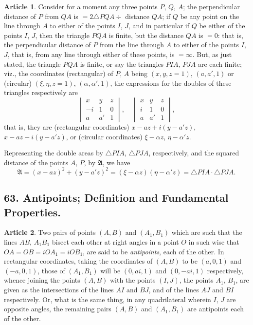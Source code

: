 \documentclass[11pt,a4paper]{article}
\theoremstyle{definition}
\newtheorem{art}{Article}
\begin{document}
\begin{art}
Consider for a moment any three points $P$, $Q$, $A$; the perpendicular distance of $P$ from $QA$ is $= 2\triangle PQA \div$ distance $QA$; if $Q$ be any point on the line through $A$ to either of the points $I$, $J$, and in particular if $Q$ be either of the points $I$, $J$, then the triangle $PQA$ is finite, but the distance $QA$ is $= 0$: that is, the perpendicular distance of $P$ from the line through $A$ to either of the points $I$, $J$, that is, from any line through either of these points, is $= \infty$. But, as just stated, the triangle $PQA$ is finite, or say the triangles $PIA$, $PJA$ are each finite; viz., the coordinates (rectangular) of $P$, $A$ being $(x, y, z = 1)$, $(a, a', 1)$ or (circular) $(\xi, \eta, z = 1)$, $(\alpha, \alpha', 1)$, the expressions for the doubles of these triangles respectively are
\[
\begin{vmatrix} x & y & z \\ -i & 1 & 0 \\ a & a' & 1 \end{vmatrix}, \quad
\begin{vmatrix} x & y & z \\ i & 1 & 0 \\ a & a' & 1 \end{vmatrix},
\]
that is, they are (rectangular coordinates) $x - az + i(y - a'z)$, $x - az - i(y - a'z)$, or (circular coordinates) $\xi - \alpha z$, $\eta - \alpha' z$.

Representing the double areas by $\triangle PIA$, $\triangle PJA$, respectively, and the squared distance of the points $A$, $P$, by $\mathfrak{A}$, we have
\[
\mathfrak{A} = (x - az)^{2} + (y - a'z)^{2} = (\xi - \alpha z)(\eta - \alpha' z) = \triangle PIA \cdot \triangle PJA.
\]
\end{art}

\subsection{63. Antipoints; Definition and Fundamental Properties.}

\begin{art}
Two pairs of points $(A, B)$ and $(A_{1}, B_{1})$ which are such that the lines $AB$, $A_{1}B_{1}$ bisect each other at right angles in a point $O$ in such wise that $OA = OB = iOA_{1} = iOB_{1}$, are said to be \textit{antipoints}, each of the other. In rectangular coordinates, taking the coordinates of $(A, B)$ to be $(a, 0, 1)$ and $(-a, 0, 1)$, those of $(A_{1}, B_{1})$ will be $(0, ai, 1)$ and $(0, -ai, 1)$ respectively, whence joining the points $(A, B)$ with the points $(I, J)$, the points $A_{1}$, $B_{1}$, are given as the intersections of the lines $AI$ and $BJ$, and of the lines $AJ$ and $BI$ respectively. Or, what is the same thing, in any quadrilateral wherein $I$, $J$ are opposite angles, the remaining pairs $(A, B)$ and $(A_{1}, B_{1})$ are antipoints each of the other.
\end{art}
\end{document}
